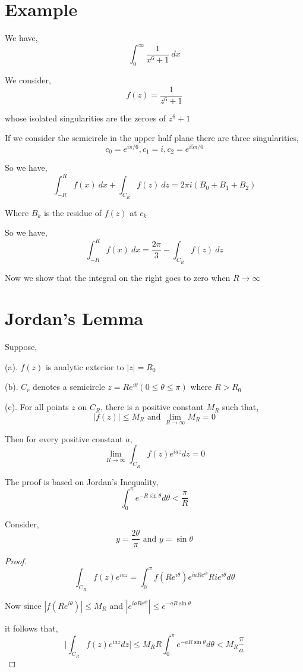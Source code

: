 \section{Example}

We have, 
$$ \int_{{0}}^{{\infty}} {\frac{1}{x^{6} + 1}} \: d{x} $$ 

We consider, 
$$ f(z) = \frac{1}{z^{6} + 1} $$ 

whose isolated singularities are the zeroes of $z^{6} + 1$

If we consider the semicircle in the upper half plane there are three singularities, 
$$ c_0 = e^{i \pi / 6}, c_1 = i , c_2 = e^{i 5\pi / 6}$$ 

So we have, 
$$ \int_{{-R}}^{{R}} {f(x)} \: d{x} + \int_{{C_R}}^{{}} {f(z)} \: d{z} = 2\pi i(B_0 + B_1 + B_2) $$ 

Where $B_k$ is the residue of $f(z)$ at $c_k$

So we have, 
$$ \int_{{-R}}^{{R}} {f(x)} \: d{x} = \frac{2\pi}{3} - \int_{{C_R}}^{{}} {f(z)} \: d{z} $$ 

Now we show that the integral on the right goes to zero when $R \rightarrow \infty$ 

\section{Jordan's Lemma}
\begin{theorem}
   Suppose, 

   (a). $f(z)$ is analytic exterior to $|z| = R_0$ 

   (b). $C_r$ denotes a semicircle $z = Re^{i\theta}(0 \le \theta \le \pi)$ where $R > R_0$ 

   (c). For all points $z$ on $C_R$, there is a positive constant $M_R$ such that, 
   $$ |f(z)| \le M_R \text{ and } \lim_{R \to \infty} M_R = 0$$  

   Then for every positive constant $a$, 
   $$ \lim_{R \to \infty} \int_{C_R} f(z) e^{iaz} dz = 0 $$ 
\end{theorem}
\begin{remark}
   The proof is based on Jordan's Inequality, 
   $$ \int_0^{\pi} e^{-R \sin \theta}d\theta < \frac{\pi}{R} $$ 

   Consider, 
   $$ y = \frac{2\theta}{\pi} \text{ and } y = \sin \theta $$ 
\end{remark}
\begin{proof}
   
   $$ \int_{C_R} f(z) e^{iaz} = \int_0^{\pi} f(Re^{i\theta}) e^{iaRe^{i\theta}}Rie^{i\theta}d\theta$$ 

   Now since $|f(Re^{i\theta})| \le M_R$ and $|e^{iaRe^{i\theta}}| \le e^{-aR \sin \theta}$ 

   it follows that, 
   $$ \bigg | \int_{C_R}f(z) e^{iaz}dz\bigg | \le M_R R\int_0^{\pi} e^{-aR\sin \theta}d\theta < M_R\frac{\pi}{a} $$ 
\end{proof}



